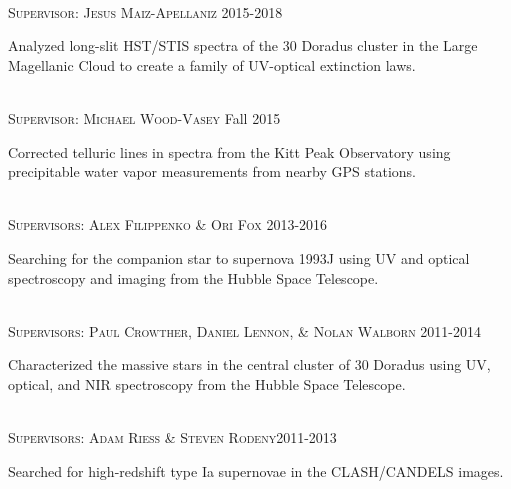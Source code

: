 \documentclass[10pt]{cv}
\begin{document}
\begin{llist}
\begin{minipage}[l]{0.7\textwidth}
\end{minipage}
\\
\textsc{Supervisor: Jesus Maiz-Apellaniz} \hfill 2015-2018\\
\begin{minipage}[l]{0.7\textwidth}\vspace{0.15cm}
Analyzed long-slit HST/STIS spectra of the 30 Doradus cluster in 
the Large Magellanic Cloud to create a family of UV-optical extinction laws. \\
\end{minipage}
\\
\textsc{Supervisor: Michael Wood-Vasey} \hfill Fall 2015\\
\begin{minipage}[l]{0.7\textwidth}\vspace{0.15cm}
Corrected telluric lines in spectra from the Kitt Peak Observatory using
precipitable water vapor measurements from nearby GPS stations.\\
\end{minipage}
\\
\textsc{Supervisors: Alex Filippenko \& Ori Fox} \hfill 2013-2016\\
\begin{minipage}[l]{0.7\textwidth}\vspace{0.15cm}
Searching for the companion star to supernova 1993J using UV and optical 
spectroscopy and imaging from the Hubble Space Telescope.\\
\end{minipage}
\\
\textsc{Supervisors: Paul Crowther, Daniel Lennon, \& Nolan Walborn} \hfill 2011-2014\\
\begin{minipage}[l]{0.7\textwidth}\vspace{0.15cm}
Characterized the massive stars in the central cluster of 30 Doradus using 
UV, optical, and NIR spectroscopy from the Hubble Space Telescope.\\
\end{minipage}
\\
\textsc{Supervisors: Adam Riess \& Steven Rodeny}\hfill 2011-2013\\
\begin{minipage}[l]{0.7\textwidth}\vspace{0.15cm}
Searched for high-redshift type Ia supernovae in the CLASH/CANDELS images.\\
\end{minipage}
\\

\end{llist}
\end{document}
